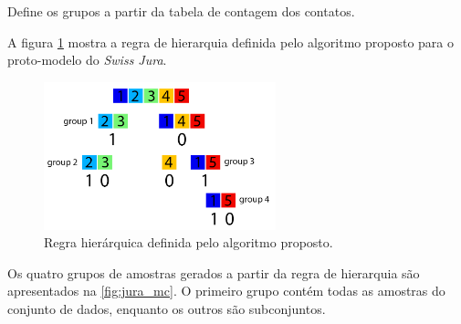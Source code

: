 \begin{algorithm}[H]
\SetAlgoLined
 \caption{Define os grupos a partir da tabela de contagem dos contatos.}\label{algo:group}
\end{algorithm}

A figura \ref{fig:groups_fig} mostra a regra de hierarquia definida pelo algoritmo proposto para o proto-modelo do \textit{Swiss Jura}.

\begin{figure}[H]
	\caption{\label{fig:groups_fig} Regra hierárquica definida pelo algoritmo proposto.}
	\centering
		\includegraphics[width=0.6\textwidth]{capitulo_3/imagens/grouping.png}
\end{figure}

Os quatro grupos de amostras gerados a partir da regra de hierarquia são apresentados na \autoref{fig:jura_mc}. O primeiro grupo contém todas as amostras do conjunto de dados, enquanto os outros são subconjuntos.

